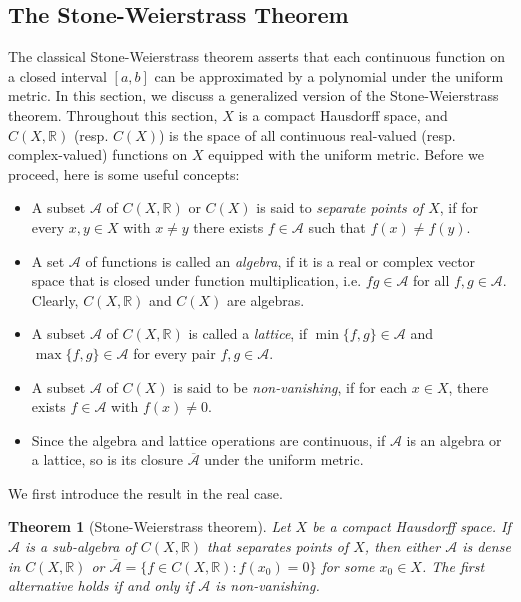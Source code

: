 \documentclass{article}
\numberwithin{equation}{section}
\newcommand{\bbR}{\mathbb{R}}
\renewcommand{\cal}{\mathcal}
\newcommand{\ol}{\overline}
\theoremstyle{plain}
\newtheorem{theorem}{Theorem}[section]
\theoremstyle{definition}
\begin{document}
\newpage
\subsection{The Stone-Weierstrass Theorem}
The classical Stone-Weierstrass theorem asserts that each continuous function on a closed interval $[a,b]$ can be approximated by a polynomial under the uniform metric. In this section, we discuss a generalized version of the Stone-Weierstrass theorem. Throughout this section, $X$ is a compact Hausdorff space, and $C(X,\bbR)$ (resp. $C(X)$) is the space of all continuous real-valued (resp. complex-valued) functions on $X$ equipped with the uniform metric. Before we proceed, here is some useful concepts:
\begin{itemize}
\item A subset $\cal{A}$ of $C(X,\bbR)$ or $C(X)$ is said to \textit{separate points of $X$}, if for every $x,y\in X$ with $x\neq y$ there exists $f\in\cal{A}$ such that $f(x)\neq f(y)$.
\item A set $\cal{A}$ of functions is called an \textit{algebra}, if it is a real or complex vector space that is closed under function multiplication, i.e. $fg\in\cal{A}$ for all $f,g\in\cal{A}$. Clearly, $C(X,\bbR)$ and $C(X)$ are algebras.
\item A subset $\cal{A}$ of $C(X,\bbR)$ is called a \textit{lattice}, if $\min\{f,g\}\in\cal{A}$ and $\max\{f,g\}\in\cal{A}$ for every pair $f,g\in\cal{A}$.
\item A subset $\cal{A}$ of $C(X)$ is said to be \textit{non-vanishing}, if for each $x\in X$, there exists $f\in\cal{A}$ with $f(x)\neq 0$.
\item Since the algebra and lattice operations are continuous, if $\cal{A}$ is an algebra or a lattice, so is its closure $\overline{\cal{A}}$ under the uniform metric. 
\end{itemize}
We first introduce the result in the real case.

\begin{theorem}[Stone-Weierstrass theorem]\label{stoneweierstrassreal}
Let $X$ be a compact Hausdorff space. If $\cal{A}$ is a sub-algebra of $C(X,\bbR)$ that separates points of $X$, then either $\cal{A}$ is dense in $C(X,\bbR)$ or $\ol{\cal{A}}=\{f\in C(X,\bbR):f(x_0)=0\}$ for some $x_0\in X$. The first alternative holds if and only if $\cal{A}$ is non-vanishing.
\end{theorem}
\end{document}
